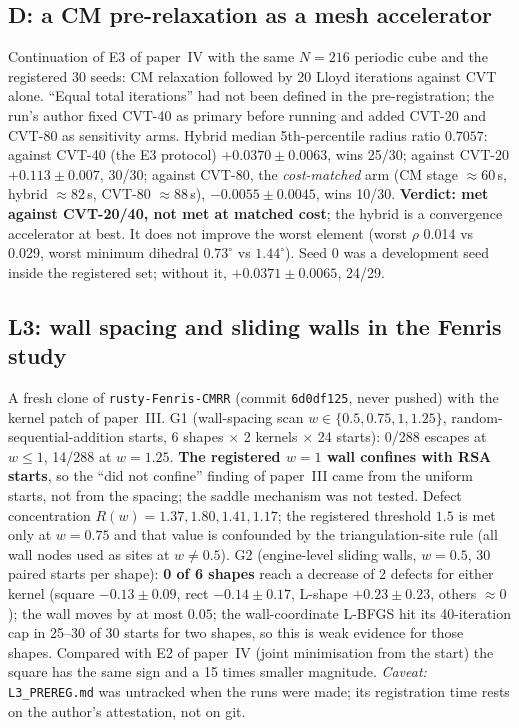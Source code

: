 \documentclass[11pt,a4paper]{article}
\begin{document}
\subsection{D: a CM pre-relaxation as a mesh accelerator}
Continuation of E3 of paper~IV with the same $N=216$ periodic cube and the registered 30 seeds: CM relaxation followed by 20 Lloyd
iterations against CVT alone. ``Equal total iterations'' had not been defined in the pre-registration; the run's author fixed
CVT-40 as primary before running and added CVT-20 and CVT-80 as sensitivity arms. Hybrid median 5th-percentile radius ratio
$0.7057$: against CVT-40 (the E3 protocol) $+0.0370\pm0.0063$, wins 25/30; against CVT-20 $+0.113\pm0.007$, 30/30; against
CVT-80, the \emph{cost-matched} arm (CM stage $\approx60$\,s, hybrid $\approx82$\,s, CVT-80 $\approx88$\,s), $-0.0055\pm0.0045$,
wins 10/30. \textbf{Verdict: met against CVT-20/40, not met at matched cost}; the hybrid is a convergence accelerator at best. It
does not improve the worst element (worst $\rho$ 0.014 vs 0.029, worst minimum dihedral $0.73^\circ$ vs $1.44^\circ$). Seed 0 was a
development seed inside the registered set; without it, $+0.0371\pm0.0065$, 24/29.

\subsection{L3: wall spacing and sliding walls in the Fenris study}\label{sec:L3}
A fresh clone of \texttt{rusty-Fenris-CMRR} (commit \texttt{6d0df125}, never pushed) with the kernel patch of paper~III. G1
(wall-spacing scan $w\in\{0.5,0.75,1,1.25\}$, random-sequential-addition starts, 6 shapes $\times$ 2 kernels $\times$ 24 starts):
0/288 escapes at $w\le1$, 14/288 at $w=1.25$. \textbf{The registered $w=1$ wall confines with RSA starts}, so the ``did not confine''
finding of paper~III came from the uniform starts, not from the spacing; the saddle mechanism was not tested. Defect concentration
$R(w)=1.37,1.80,1.41,1.17$; the registered threshold $1.5$ is met only at $w=0.75$ and that value is confounded by the
triangulation-site rule (all wall nodes used as sites at $w\ne0.5$). G2 (engine-level sliding walls, $w=0.5$, 30 paired starts per
shape): \textbf{0 of 6 shapes} reach a decrease of 2 defects for either kernel (square $-0.13\pm0.09$, rect $-0.14\pm0.17$,
L-shape $+0.23\pm0.23$, others $\approx0$); the wall moves by at most $0.05$; the wall-coordinate L-BFGS hit its 40-iteration cap in
25--30 of 30 starts for two shapes, so this is weak evidence for those shapes. Compared with E2 of paper~IV (joint minimisation from
the start) the square has the same sign and a 15 times smaller magnitude. \emph{Caveat:} \texttt{L3\_PREREG.md} was untracked when
the runs were made; its registration time rests on the author's attestation, not on git.
\end{document}
